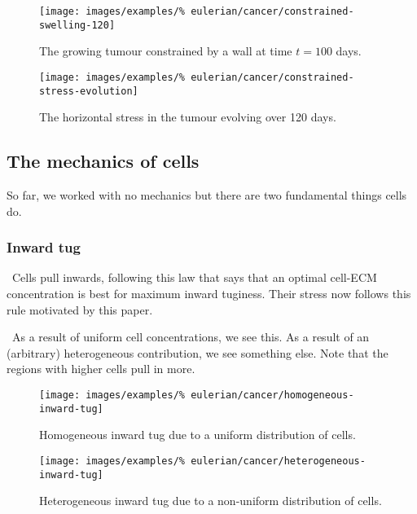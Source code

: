 \begin{figure}[!hptb]
\centering
\texttt{[image: images/examples/\%
eulerian/cancer/constrained-swelling-120]}
\caption{The growing tumour constrained by a wall at time $t=100$ days.}
\label{tumour-constrained-swelling-120}
\end{figure}

\begin{figure}[!hptb]
\centering
\texttt{[image: images/examples/\%
eulerian/cancer/constrained-stress-evolution]}
\caption{The horizontal stress in the tumour evolving over 120 days.}
\label{tumour-constrained-stress-evolution}
\end{figure}

\subsection{The mechanics of cells}
\label{cell-roles}

So far, we worked with no mechanics but there are two fundamental
things cells do.

\subsubsection{Inward tug}
\label{inward-tug}

\textbullet\ Cells pull inwards, following this law that says that an
optimal cell-ECM concentration is best for maximum inward
tuginess. Their stress now follows this rule motivated by this paper.

\textbullet\ As a result of uniform cell concentrations, we see
this. As a result of an (arbitrary) heterogeneous contribution, we see
something else. Note that the regions with higher cells pull in more.

\begin{figure}[!hptb]
\centering
\texttt{[image: images/examples/\%
eulerian/cancer/homogeneous-inward-tug]}
\caption{Homogeneous inward tug due to a uniform distribution of cells.}
\label{tumour-homogeneous-inward-tug}
\end{figure}

\begin{figure}[!hptb]
\centering
\texttt{[image: images/examples/\%
eulerian/cancer/heterogeneous-inward-tug]}
\caption{Heterogeneous inward tug due to a non-uniform distribution of cells.}
\label{tumour-heterogeneous-inward-tug}
\end{figure}

